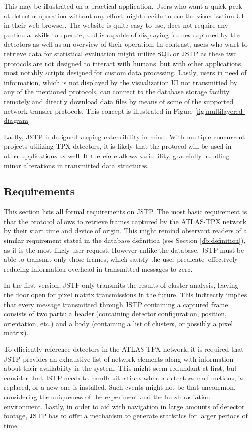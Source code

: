 This may be illustrated on a practical application. Users who want a quick peek at detector operation without any effort might decide to use the visualization UI in their web browser. The website is quite easy to use, does not require any particular skills to operate, and is capable of displaying frames captured by the detectors as well as an overview of their operation. In contrast, users who want to retrieve data for statistical evaluation might utilize SQL or JSTP as these two protocols are not designed to interact with humans, but with other applications, most notably scripts designed for custom data processing. Lastly, users in need of information, which is not displayed by the visualization UI nor transmitted by any of the mentioned protocols, can connect to the database storage facility remotely and directly download data files by means of some of the supported network transfer protocols. This concept is illustrated in Figure \ref{fig:multilayered-diagram}.

Lastly, JSTP is designed keeping extensibility in mind. With multiple concurrent projects utilizing TPX detectors, it is likely that the protocol will be used in other applications as well. It therefore allows variability, gracefully handling minor alterations in transmitted data structures.

\subsection{Requirements}
This section lists all formal requirements on JSTP. The most basic requirement is that the protocol allows to retrieve frames captured by the ATLAS-TPX network by their start time and device of origin. This might remind observant readers of a similar requirement stated in the database definition (see Section \ref{db:definition}), as it is the most likely user request. However unlike the database, JSTP must be able to transmit only those frames, which satisfy the user predicate, effectively reducing information overhead in transmitted messages to zero.

In the first version, JSTP only transmits the results of cluster analysis, leaving the door open for pixel matrix transmissions in the future. This indirectly implies that every message transmitted through JSTP containing a captured frame consists of two parts: a header (containing detector configuration, position, orientation, etc.) and a body (containing a list of clusters, or possibly a pixel matrix).

To efficiently reference detectors in the ATLAS-TPX network, it is required that JSTP provides an exhaustive list of network elements along with information about their availability in the system. This might seem redundant at first, but consider that JSTP needs to handle situations when a detectors malfunctions, is replaced, or a new one is installed. Such events might not be that uncommon, considering the uniqueness of the experiment and the harsh radiation environment. Lastly, in order to aid with navigation in large amounts of detector footage, JSTP has to offer a mechanism to generate statistics for larger periods of time.


